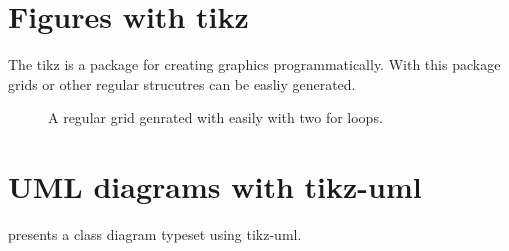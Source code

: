 \section{Figures with tikz}
The tikz is a package for creating graphics programmatically. With this package grids or other regular strucutres can be easliy generated.

\begin{figure}[ht]
  \begin{center}
  \end{center}
  \caption{A regular grid genrated with easily with two for loops.}\label{fig:tikz_example}
\end{figure}


\section{UML diagrams with tikz-uml}

 presents a class diagram typeset using tikz-uml.


